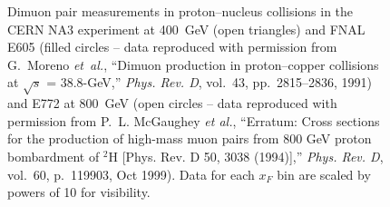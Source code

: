 \documentclass[a4paper,10pt]{article}
\begin{document}
\begin{figure}[p]
%
\caption{Dimuon pair measurements in proton--nucleus collisions in the CERN
NA3 experiment at 400~GeV (open triangles) and
FNAL E605 (filled circles -- data reproduced with permission from
G.~Moreno {\em et~al.}, ``{Dimuon production in proton--copper collisions at
  $\sqrt{s}$ = 38.8-GeV},'' {\em Phys. Rev. D}, vol.~43, pp.~2815--2836, 1991)
and E772 at 800~GeV (open circles -- data reproduced with permission from
P.~L. McGaughey {\it et al.}, ``Erratum: Cross sections
  for the production of high-mass muon pairs from 800 GeV proton bombardment of
  ${}^{2}\mathrm{H}$ [Phys. Rev. D 50, 3038 (1994)],'' {\em Phys. Rev. D},
  vol.~60, p.~119903, Oct 1999).
Data for each $x_F$ bin are scaled by powers of 10 for visibility.
}
\doclicenseThis
\end{figure}
%
%
\end{document}

